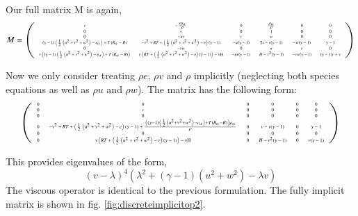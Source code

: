 \documentclass[letterpaper,11pt,nointlimits,reqno,draft]{amsart}
\begin{document}
Our full matrix M is again,
\begin{equation}
\tiny
M = 
\left(
\begin{array}{cccccc}
 v & -\frac{v \rho _{\alpha }}{\rho } & 0 & \frac{\rho _{\alpha }}{\rho } & 0 & 0 \\
 0 & v & 0 & 1 & 0 & 0 \\
 0 & -u v & v & u & 0 & 0 \\
 (\gamma -1) \left(\frac{1}{2} \left(u^2+v^2+w^2\right)-e_{\alpha }\right)+T \left(R_{\alpha }-R\right) & -v^2+R T+\left(\frac{1}{2} \left(u^2+v^2+w^2\right)-e\right) (\gamma
   -1) & -u (\gamma -1) & 2 v-v (\gamma -1) & -w (\gamma -1) & \gamma -1 \\
 0 & -v w & 0 & w & v & 0 \\
 v \left((\gamma -1) \left(\frac{1}{2} \left(u^2+v^2+w^2\right)-e_{\alpha }\right)+T \left(R_{\alpha }-R\right)\right) & v \left(R T+\left(\frac{1}{2}
   \left(u^2+v^2+w^2\right)-e\right) (\gamma -1)\right)-\text{vH} & -u v (\gamma -1) & H-v^2 (\gamma -1) & -v w (\gamma -1) & (\gamma -1) v+v
\end{array}
\right)
\end{equation}

Now we only consider treating $\rho e$, $\rho v$ and $\rho$ implicitly
(neglecting both species equations as well as $\rho u$ and $\rho
w$). The matrix has the following form:
\begin{equation}
\tiny
\left(
\begin{array}{cccccc}
 0 & 0 & 0 & 0 & 0 & 0 \\
 0 & v & 0 & 0 & 0 & 0 \\
 0 & 0 & 0 & 0 & 0 & 0 \\
 0 & -v^2+R T+\left(\frac{1}{2} \left(u^2+v^2+w^2\right)-e\right) (\gamma -1)+\frac{\left((\gamma -1) \left(\frac{1}{2} \left(u^2+v^2+w^2\right)-e_{\alpha }\right)+T \left(R_{\alpha
   }-R\right)\right) \rho _{\alpha }}{\rho } & 0 & v-v (\gamma -1) & 0 & \gamma -1 \\
 0 & 0 & 0 & 0 & 0 & 0 \\
 0 & v \left(R T+\left(\frac{1}{2} \left(u^2+v^2+w^2\right)-e\right) (\gamma -1)\right)-\text{vH} & 0 & H-v^2 (\gamma -1) & 0 & v (\gamma -1)
\end{array}
\right)
\end{equation}

This provides eigenvalues of the form, 
\begin{equation}
(v-\lambda )^4 \left(\lambda ^2+(\gamma -1) \left(u^2+w^2\right)-\lambda  v\right)
\end{equation}
The viscous operator is identical to the previous
formulation. The fully implicit matrix is shown in fig. \ref{fig:discreteimplicitop2}.
\end{document}
